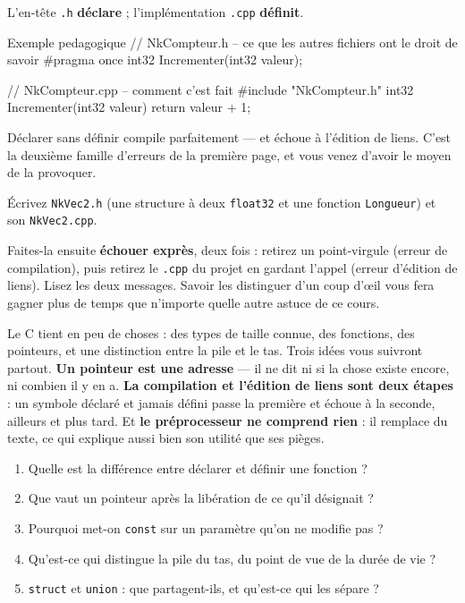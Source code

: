 L'en-tête \texttt{.h} \textbf{déclare} ; l'implémentation \texttt{.cpp}
\textbf{définit}.

\begin{nkcode}{Exemple pedagogique}
// NkCompteur.h -- ce que les autres fichiers ont le droit de savoir
#pragma once
int32 Incrementer(int32 valeur);

// NkCompteur.cpp -- comment c'est fait
#include "NkCompteur.h"
int32 Incrementer(int32 valeur) { return valeur + 1; }
\end{nkcode}

Déclarer sans définir compile parfaitement --- et échoue à l'édition de liens.
C'est la deuxième famille d'erreurs de la première page, et vous venez d'avoir le
moyen de la provoquer.

\begin{nkpratique}
Écrivez \texttt{NkVec2.h} (une structure à deux \texttt{float32} et une fonction
\texttt{Longueur}) et son \texttt{NkVec2.cpp}.

Faites-la ensuite \textbf{échouer exprès}, deux fois : retirez un point-virgule
(erreur de compilation), puis retirez le \texttt{.cpp} du projet en gardant
l'appel (erreur d'édition de liens). Lisez les deux messages. Savoir les
distinguer d'un coup d'\oe il vous fera gagner plus de temps que n'importe quelle
autre astuce de ce cours.
\end{nkpratique}

\begin{nkbilan}
Le C tient en peu de choses : des types de taille connue, des fonctions, des
pointeurs, et une distinction entre la pile et le tas. Trois idées vous
suivront partout. \textbf{Un pointeur est une adresse} --- il ne dit ni si la
chose existe encore, ni combien il y en a. \textbf{La compilation et l'édition
de liens sont deux étapes} : un symbole déclaré et jamais défini passe la
première et échoue à la seconde, ailleurs et plus tard. Et \textbf{le
préprocesseur ne comprend rien} : il remplace du texte, ce qui explique aussi
bien son utilité que ses pièges.
\end{nkbilan}

\begin{nkquestions}
\begin{enumerate}
\item Quelle est la différence entre déclarer et définir une fonction ?
\item Que vaut un pointeur après la libération de ce qu'il désignait ?
\item Pourquoi met-on \texttt{const} sur un paramètre qu'on ne modifie pas ?
\item Qu'est-ce qui distingue la pile du tas, du point de vue de la durée de
      vie ?
\item \texttt{struct} et \texttt{union} : que partagent-ils, et qu'est-ce qui
      les sépare ?
\end{enumerate}
\end{nkquestions}

